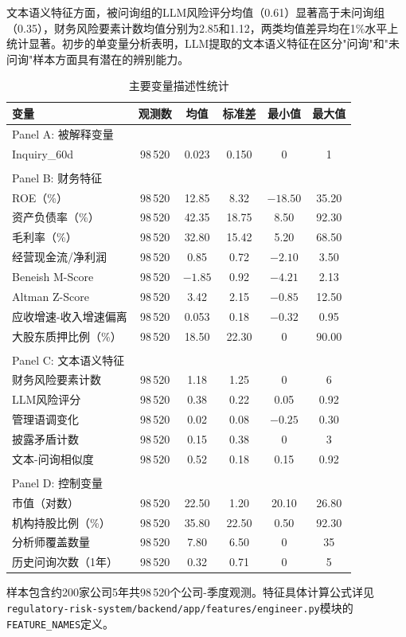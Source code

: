 文本语义特征方面，被问询组的LLM风险评分均值（0.61）显著高于未问询组（0.35），财务风险要素计数均值分别为2.85和1.12，两类均值差异均在1\%水平上统计显著。初步的单变量分析表明，LLM提取的文本语义特征在区分"问询"和"未问询"样本方面具有潜在的辨别能力。

\begin{table}[H]
\centering
\caption{主要变量描述性统计}
\label{tab:summary}
\begin{threeparttable}
\begin{tabular}{lccccc}
\toprule
变量 & 观测数 & 均值 & 标准差 & 最小值 & 最大值 \\
\midrule
Panel A: 被解释变量 & & & & & \\
Inquiry\_60d & 98\,520 & 0.023 & 0.150 & 0 & 1 \\
\\
Panel B: 财务特征 & & & & & \\
ROE（\%） & 98\,520 & 12.85 & 8.32 & $-18.50$ & 35.20 \\
资产负债率（\%） & 98\,520 & 42.35 & 18.75 & 8.50 & 92.30 \\
毛利率（\%） & 98\,520 & 32.80 & 15.42 & 5.20 & 68.50 \\
经营现金流/净利润 & 98\,520 & 0.85 & 0.72 & $-2.10$ & 3.50 \\
Beneish M-Score & 98\,520 & $-1.85$ & 0.92 & $-4.21$ & 2.13 \\
Altman Z-Score & 98\,520 & 3.42 & 2.15 & $-0.85$ & 12.50 \\
应收增速-收入增速偏离 & 98\,520 & 0.053 & 0.18 & $-0.32$ & 0.95 \\
大股东质押比例（\%） & 98\,520 & 18.50 & 22.30 & 0 & 90.00 \\
\\
Panel C: 文本语义特征 & & & & & \\
财务风险要素计数 & 98\,520 & 1.18 & 1.25 & 0 & 6 \\
LLM风险评分 & 98\,520 & 0.38 & 0.22 & 0.05 & 0.92 \\
管理语调变化 & 98\,520 & 0.02 & 0.08 & $-0.25$ & 0.30 \\
披露矛盾计数 & 98\,520 & 0.15 & 0.38 & 0 & 3 \\
文本-问询相似度 & 98\,520 & 0.52 & 0.18 & 0.15 & 0.92 \\
\\
Panel D: 控制变量 & & & & & \\
市值（对数） & 98\,520 & 22.50 & 1.20 & 20.10 & 26.80 \\
机构持股比例（\%） & 98\,520 & 35.80 & 22.50 & 0.50 & 92.30 \\
分析师覆盖数量 & 98\,520 & 7.80 & 6.50 & 0 & 35 \\
历史问询次数（1年） & 98\,520 & 0.32 & 0.71 & 0 & 5 \\
\bottomrule
\end{tabular}
\begin{tablenotes}
\item[注] 样本包含约200家公司5年共98\,520个公司-季度观测。特征具体计算公式详见\texttt{regulatory-risk-system/backend/app/features/engineer.py}模块的\texttt{FEATURE\_NAMES}定义。
\end{tablenotes}
\end{threeparttable}
\end{table}


